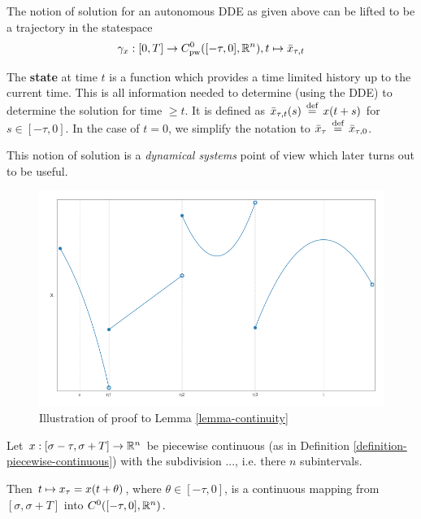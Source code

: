 \documentclass[10pt]{article}
\begin{document}
The notion of solution for an autonomous DDE as given above can be lifted to be a trajectory in the statespace
\begin{equation}
    \gamma_x:[0,T]\rightarrow C^0_\text{pw}([-\tau,0],\mathbb{R}^n),\\ t\mapsto\bar{x}_{\tau,t}
\end{equation}

The \textbf{state} at time $t$ is a function which provides a time limited history up to the current time. This is all information needed to determine (using the DDE) to determine the solution for time $\geq t$. It is defined as $\bar{x}_{\tau,t}(s)\,\stackrel{\text{def}}{=}\, x(t+s)$ for $s\in [-\tau,0]$. In the case of $t=0$, we simplify the notation to $\bar{x}_{\tau} \,\stackrel{\text{def}}{=}\, \bar{x}_{\tau,0}$.

This notion of solution is a \emph{dynamical systems} point of view which later turns out to be useful.

\begin{figure}[h]\centering
    \includegraphics[width=\textwidth]{multiple.png}
	\caption{Illustration of proof to Lemma \ref{lemma-continuity}}
	\label{fig:not-allowed}
\end{figure}

\begin{lemma}
    \label{lemma-continuity}

    Let $x:[\sigma-\tau,\sigma+T] \rightarrow \mathbb{R}^n$ be piecewise continuous (as in Definition \ref{definition-piecewise-continuous}) with the subdivision ..., i.e. there $n$ subintervals.

    Then $t \mapsto x_{\tau} = x(t+\theta)$, where $\theta\in[-\tau,0]$, is a continuous mapping from $[\sigma,\sigma+T]$ into $C^0([-\tau,0],\mathbb{R}^n)$.
\end{lemma}
\end{document}
